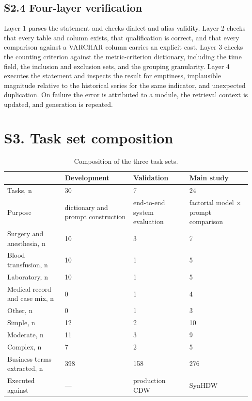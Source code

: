 \documentclass[10pt]{article}
\begin{document}
\subsection{S2.4 Four-layer verification}
Layer 1 parses the statement and checks dialect and alias validity. Layer 2
checks that every table and column exists, that qualification is correct, and
that every comparison against a VARCHAR column carries an explicit cast. Layer 3
checks the counting criterion against the metric-criterion dictionary, including
the time field, the inclusion and exclusion sets, and the grouping granularity.
Layer 4 executes the statement and inspects the result for emptiness,
implausible magnitude relative to the historical series for the same indicator,
and unexpected duplication. On failure the error is attributed to a module, the
retrieval context is updated, and generation is repeated.

\section{S3. Task set composition}

\begin{table}[h]\centering
\caption{Composition of the three task sets.}
\footnotesize
\begin{tabular}{@{}L{4.6cm}C{2.2cm}C{2.2cm}C{2.2cm}@{}}
\toprule
& Development & Validation & Main study\\
\midrule
Tasks, n                         & 30  & 7   & 24\\
Purpose                          & dictionary and prompt construction & end-to-end system evaluation & factorial model $\times$ prompt comparison\\
Surgery and anesthesia, n        & 10  & 3   & 7\\
Blood transfusion, n             & 10  & 1   & 5\\
Laboratory, n                    & 10  & 1   & 5\\
Medical record and case mix, n   & 0   & 1   & 4\\
Other, n                         & 0   & 1   & 3\\
\addlinespace
Simple, n                        & 12 & 2 & 10\\
Moderate, n                      & 11 & 3 & 9\\
Complex, n                       & 7  & 2 & 5\\
\addlinespace
Business terms extracted, n & 398 & 158 & 276\\
Executed against                 & --- & production CDW & SynHDW\\
\bottomrule
\end{tabular}
\end{table}
\end{document}

